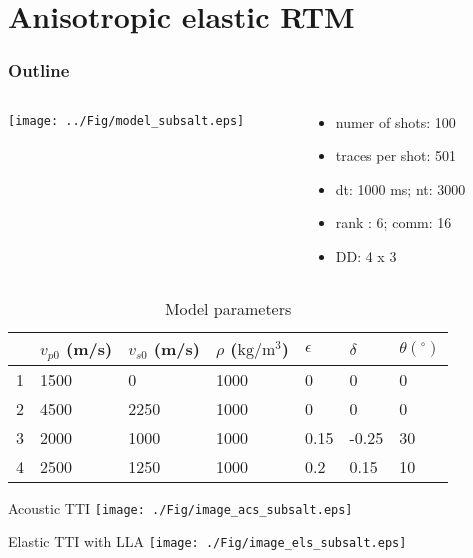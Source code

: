 \documentclass[aspectratio=169]{beamer}
\begin{document}
\section{Anisotropic elastic RTM}
\begin{frame}
\frametitle{Outline}
\tableofcontents[currentsection]
\end{frame}
\begin{frame}
\begin{columns}
  \begin{column}{0.6\textwidth}
  \texttt{[image: ../Fig/model\_subsalt.eps]}
  \end{column}
  \begin{column}{0.4\textwidth}
\begin{itemize}
\item{numer of shots: 100}
\item{traces per shot: 501}
\item{dt: 1000 ms; nt: 3000}
\item{rank : 6; comm: 16}
\item{DD: 4 x 3}
\end{itemize}
  \end{column}
\end{columns}

\begin{table}[]
\centering
\begin{tabular}{|l|l|l|l|l|l|l|}
\hline
  &  $v_{p0}$ (m/s) & $v_{s0}$ (m/s) & $\rho$ ($\mathrm{kg/m^3}$) & $\epsilon$ & $\delta$  & $\theta(^\circ)$ \\ \hline
1 & 1500     & 0        & 1000        & 0    & 0     & 0    \\ \hline
2 & 4500     & 2250     & 1000        & 0    & 0     & 0    \\ \hline
3 & 2000     & 1000     & 1000        & 0.15 & -0.25 & 30   \\ \hline
4 & 2500     & 1250     & 1000        & 0.2  & 0.15  & 10   \\ \hline
\end{tabular}
\caption{Model parameters}
\end{table}
\end{frame}
\begin{frame}{Acoustic TTI}
\center
  \texttt{[image: ./Fig/image\_acs\_subsalt.eps]}
\end{frame}
\begin{frame}{Elastic TTI with LLA}
\center
  \texttt{[image: ./Fig/image\_els\_subsalt.eps]}
\end{frame}
\end{document}
